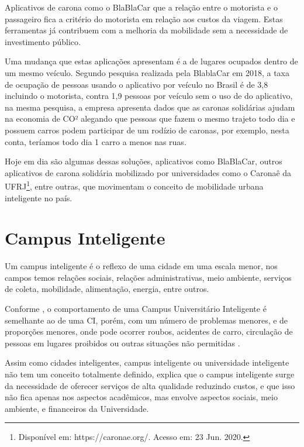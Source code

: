 Aplicativos de carona como o BlaBlaCar  que a relação entre o motorista e o passageiro fica a critério do motorista em relação aos custos da viagem. Estas ferramentas já contribuem com a melhoria da mobilidade sem a necessidade de investimento público. 

Uma mudança que estas aplicações apresentam é a de lugares ocupados dentro de um mesmo veículo. Segundo pesquisa realizada pela BlablaCar em 2018, a taxa de ocupação de pessoas usando o aplicativo por veículo no Brasil é de 3,8 incluindo o motorista, contra 1,9 pessoas por veículo sem o uso de do aplicativo, na mesma pesquisa, a empresa apresenta dados que as caronas solidárias ajudam na economia de CO² alegando que pessoas que  fazem o mesmo trajeto todo dia e possuem carros podem participar de um rodízio de caronas, por exemplo, nesta conta, teríamos todo dia 1 carro a menos nas ruas.

Hoje em dia são algumas dessas soluções, aplicativos como BlaBlaCar, outros aplicativos de carona solidária mobilizado por universidades como o Caronaê da UFRJ\footnote{Disponível em: https://caronae.org/. Acesso em: 23 Jun. 2020.}, entre outras,  que movimentam o conceito de mobilidade urbana inteligente no país.

\section{Campus Inteligente}

Um campus inteligente é o reflexo de uma cidade em uma escala menor, nos campos temos relações sociais, relações administrativas, meio ambiente, serviços de coleta, mobilidade, alimentação, energia, entre outros.

Conforme , o comportamento de uma Campus Universitário Inteligente é semelhante ao de uma CI, porém, com um número de problemas menores, e de proporções menores, onde pode ocorrer roubos, acidentes de carro, circulação de pessoas em lugares proibidos ou outras situações não permitidas \cite{garay2018}.

Assim como cidades inteligentes, campus inteligente ou universidade inteligente não tem um conceito totalmente definido,  explica que o campus inteligente surge da necessidade de oferecer serviços de alta qualidade reduzindo custos, e que isso não fica apenas nos aspectos acadêmicos, mas envolve aspectos sociais, meio ambiente, e financeiros da Universidade.

